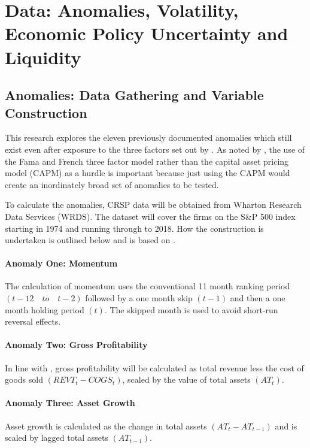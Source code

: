 \documentclass[12pt, a4paper, oneside]{article}
\begin{document}
\section{Data: Anomalies, Volatility, Economic Policy Uncertainty and Liquidity}\label{sec:data}
\subsection{Anomalies: Data Gathering and Variable Construction}
This research explores the eleven previously documented anomalies which still exist even after exposure to the three factors set out by . As noted by , the use of the Fama and French three factor model rather than the capital asset pricing model (CAPM) as a hurdle is important because just using the CAPM would create an inordinately broad set of anomalies to be tested. 

To calculate the anomalies, CRSP data will be obtained from Wharton Research Data Services (WRDS). The dataset will cover the firms on the S\&P 500 index starting in 1974 and running through to 2018. How the construction is undertaken is outlined below and is based on .

\paragraph*{Anomaly One: Momentum}
The calculation of momentum uses the conventional 11 month ranking period \\ $(t-12 \quad to \quad t-2)$ followed by a one month skip $(t-1)$ and then a one month holding period $(t)$. The skipped month is used to avoid short-run reversal effects.

\paragraph*{Anomaly Two: Gross Profitability}
In line with , gross profitability will be calculated as total revenue less the cost of goods sold \((REVT_t-COGS_t)\), scaled by the value of total assets $(AT_t)$. 

\paragraph*{Anomaly Three: Asset Growth}
Asset growth is calculated as the change in total assets \((AT_t  - AT_{t-1})\) and is scaled by lagged total assets \((AT_{t-1})\).
\end{document}

